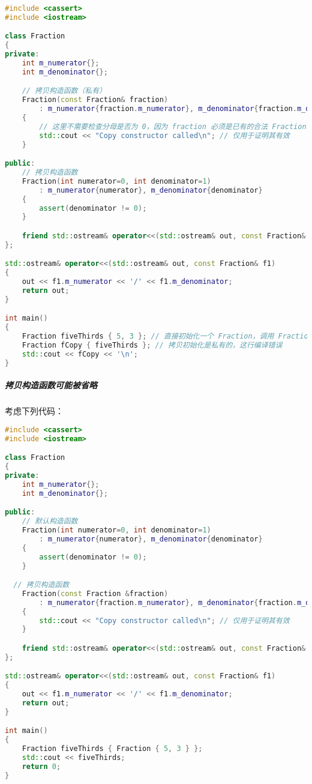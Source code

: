 \documentclass[../../LearnCpp.tex]{subfiles}
\begin{document}
\begin{lstlisting}[language=C++]
#include <cassert>
#include <iostream>

class Fraction
{
private:
    int m_numerator{};
    int m_denominator{};

    // 拷贝构造函数（私有）
    Fraction(const Fraction& fraction)
        : m_numerator{fraction.m_numerator}, m_denominator{fraction.m_denominator}
    {
        // 这里不需要检查分母是否为 0，因为 fraction 必须是已有的合法 Fraction
        std::cout << "Copy constructor called\n"; // 仅用于证明其有效
    }

public:
    // 拷贝构造函数
    Fraction(int numerator=0, int denominator=1)
        : m_numerator{numerator}, m_denominator{denominator}
    {
        assert(denominator != 0);
    }

    friend std::ostream& operator<<(std::ostream& out, const Fraction& f1);
};

std::ostream& operator<<(std::ostream& out, const Fraction& f1)
{
	out << f1.m_numerator << '/' << f1.m_denominator;
	return out;
}

int main()
{
	Fraction fiveThirds { 5, 3 }; // 直接初始化一个 Fraction，调用 Fraction(int, int) 构造函数
	Fraction fCopy { fiveThirds }; // 拷贝初始化是私有的，这行编译错误
	std::cout << fCopy << '\n';
}
\end{lstlisting}

\subparagraph*{拷贝构造函数可能被省略}

考虑下列代码：

\begin{lstlisting}[language=C++]
#include <cassert>
#include <iostream>

class Fraction
{
private:
	int m_numerator{};
	int m_denominator{};

public:
    // 默认构造函数
    Fraction(int numerator=0, int denominator=1)
        : m_numerator{numerator}, m_denominator{denominator}
    {
        assert(denominator != 0);
    }

  // 拷贝构造函数
	Fraction(const Fraction &fraction)
		: m_numerator{fraction.m_numerator}, m_denominator{fraction.m_denominator}
	{
		std::cout << "Copy constructor called\n"; // 仅用于证明其有效
	}

	friend std::ostream& operator<<(std::ostream& out, const Fraction& f1);
};

std::ostream& operator<<(std::ostream& out, const Fraction& f1)
{
	out << f1.m_numerator << '/' << f1.m_denominator;
	return out;
}

int main()
{
	Fraction fiveThirds { Fraction { 5, 3 } };
	std::cout << fiveThirds;
	return 0;
}
\end{lstlisting}
\end{document}
